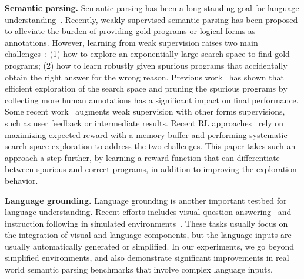 {\bf Semantic parsing.}  Semantic parsing has been a long-standing
goal for language
understanding~\cite{winograd1972understanding,zelle96geoquery,chen2011learning}.
Recently, weakly supervised semantic
parsing \cite{berant2013semantic,artzi2013weakly} has been proposed to
alleviate the burden of providing gold programs or logical forms as
annotations.  However, learning from weak supervision raises two main
challenges~\cite{berant2013semantic,pasupat2016denotations,guu2017language}:
(1) how to explore an exponentially large search space to find gold
programs; (2) how to learn robustly given spurious programs that
accidentally obtain the right answer for the wrong reason.  Previous
work~\cite{pasupat2016inferring,mudrakarta2018training,krishnamurthy2017neural}
has shown that efficient exploration of the search space and pruning
the spurious programs by collecting more human annotations has a
significant impact on final performance.  Some recent
work~\cite{berant2019explaining,cho2018adversarial} augments weak
supervision with other forms supervisions, such as user feedback or
intermediate results.  Recent RL
approaches~\cite{liang2017nsm,NIPS2018_8204} rely on maximizing
expected reward with a memory buffer and performing systematic search
space exploration to address the two challenges.  This paper takes
such an approach a step further, by learning a reward function that
can differentiate between spurious and correct programs, in addition
to improving the exploration behavior.

{\bf Language grounding.}
Language grounding is another important testbed for language understanding.
Recent efforts includes visual question answering~\cite{antol2015vqa} and
instruction following in simulated environments~\cite{hermann17,babyai}.
These tasks usually focus on the integration of visual and language components,
but the language inputs are usually automatically generated or simplified.
In our experiments, we go beyond simplified environments, and also demonstrate significant improvements
in real world semantic parsing benchmarks that involve complex language inputs.
